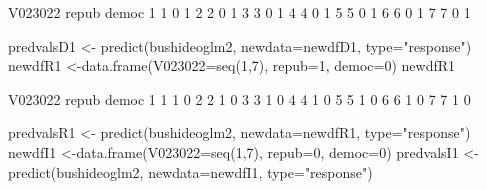 \begin{Schunk}
\begin{Soutput}
  V023022 repub democ
1       1     0     1
2       2     0     1
3       3     0     1
4       4     0     1
5       5     0     1
6       6     0     1
7       7     0     1
\end{Soutput}
\begin{Sinput}
 predvalsD1 <- predict(bushideoglm2, newdata=newdfD1, type="response")
 newdfR1 <-data.frame(V023022=seq(1,7), repub=1, democ=0)
 newdfR1
\end{Sinput}
\begin{Soutput}
  V023022 repub democ
1       1     1     0
2       2     1     0
3       3     1     0
4       4     1     0
5       5     1     0
6       6     1     0
7       7     1     0
\end{Soutput}
\begin{Sinput}
 predvalsR1 <- predict(bushideoglm2, newdata=newdfR1, type="response")
 newdfI1 <-data.frame(V023022=seq(1,7), repub=0, democ=0)
 predvalsI1 <- predict(bushideoglm2, newdata=newdfI1, type="response")
\end{Sinput}
\end{Schunk}
